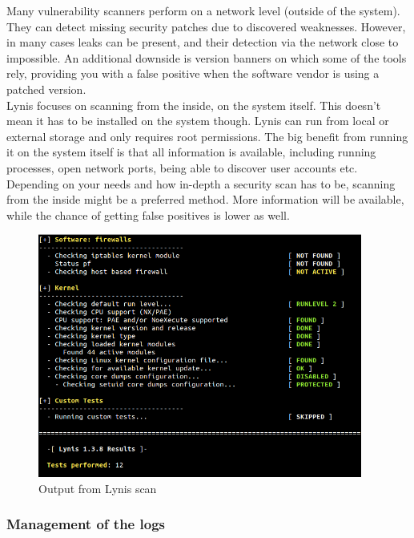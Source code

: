 Many vulnerability scanners perform on a network level (outside of the system). They can detect missing security patches due to discovered weaknesses. However, in many cases leaks can be present, and their detection via the network close to impossible. An additional downside is version banners on which some of the tools rely, providing you with a false positive when the software vendor is using a patched version.
\\

Lynis focuses on scanning from the inside, on the system itself. This doesn’t mean it has to be installed on the system though. Lynis can run from local or external storage and only requires root permissions. The big benefit from running it on the system itself is that all information is available, including running processes, open network ports, being able to discover user accounts etc. Depending on your needs and how in-depth a security scan has to be, scanning from the inside might be a preferred method. More information will be available, while the chance of getting false positives is lower as well.

\begin{figure}[!h]
  \centering
  \includegraphics[width=0.95\textwidth]{images/lynis-example.png}
  \caption{Output from Lynis scan}
  \label{Lynis}
\end{figure}

\pagebreak

\subsubsection{Management of the logs}

